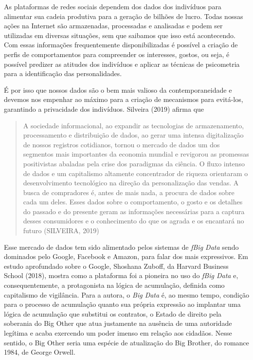 As plataformas de redes sociais dependem dos dados dos indivíduos para
alimentar sua cadeia produtiva para a geração de bilhões de lucro. Todas
nossas ações na Internet são armazenadas, processadas e analisadas e
podem ser utilizadas em diversas situações, sem que saibamos que isso
está acontecendo. Com essas informações frequentemente disponibilizadas
é possível a criação de perfis de comportamentos para compreender os
interesses, gostos, ou seja, é possível predizer as atitudes dos
indivíduos e aplicar as técnicas de psicometria para a identificação das
personalidades.

É por isso que nossos dados são o bem mais valioso da contemporaneidade
e devemos nos empenhar ao máximo para a criação de mecanismos para
evitá-los, garantindo a privacidade dos indivíduos. Silveira (2019)
afirma que

\begin{quote}
A sociedade informacional, ao expandir as tecnologias de armazenamento,
processamento e distribuição de dados, ao gerar uma intensa
digitalização de nossos registros cotidianos, tornou o mercado de dados
um dos segmentos mais importantes da economia mundial e revigorou as
promessas positivistas abaladas pela crise dos paradigmas da ciência. O
fluxo intenso de dados e um capitalismo altamente concentrador de
riqueza orientaram o desenvolvimento tecnológico na direção da
personalização das vendas. A busca de compradores é, antes de mais nada,
a procura de dados sobre cada um deles. Esses dados sobre o
comportamento, o gosto e os detalhes do passado e do presente geram as
informações necessárias para a captura desses consumidores e o
conhecimento do que os agrada e os encantará no futuro (SILVEIRA, 2019)
\end{quote}

Esse mercado de dados tem sido alimentado pelos sistemas de \textit{fBig Data}
sendo dominados pelo Google, Facebook e Amazon, para falar dos mais
expressivos. Em estudo aprofundado sobre o Google, Shoshana Zuboff, da
Harvard Business School (2018), mostra como a plataforma foi a pioneira
no uso do \textit{fBig Data} e, consequentemente, a protagonista na lógica de
acumulação, definida como capitalismo de vigilância. Para a autora, o
\textit{Big Data} é, ao mesmo tempo, condição para o processo de
acumulação quanto sua própria expressão ao implantar uma lógica de
acumulação que substitui os contratos, o Estado de direito pela
soberania do Big Other que atua justamente na ausência de uma autoridade
legítima e acaba exercendo um poder imenso em relação aos cidadãos.
Nesse sentido, o Big Other seria uma espécie de atualização do Big
Brother, do romance 1984, de George Orwell.

